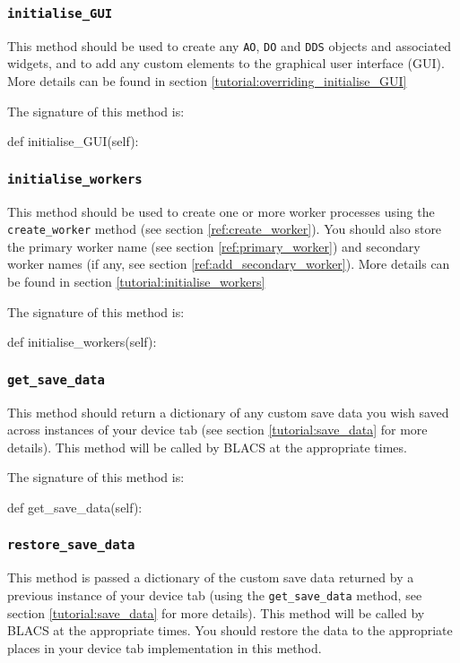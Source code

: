 \documentclass[12pt]{article}
\begin{document}
%
\subsubsection{\texttt{initialise\_GUI}}\label{ref:initialise_GUI}
This method should be used to create any \texttt{AO}, \texttt{DO} and \texttt{DDS} objects and associated widgets, and to add any custom elements to the graphical user interface (GUI).
More details can be found in section \ref{tutorial:overriding_initialise_GUI}

The signature of this method is:
\begin{python}
def initialise_GUI(self):
\end{python}

\subsubsection{\texttt{initialise\_workers}}\label{ref:initialise_workers}
This method should be used to create one or more worker processes using the \texttt{create\_worker} method (see section \ref{ref:create_worker}).
You should also store the primary worker name (see section \ref{ref:primary_worker}) and secondary worker names (if any, see section \ref{ref:add_secondary_worker}).
More details can be found in section \ref{tutorial:initialise_workers}

The signature of this method is:
\begin{python}
def initialise_workers(self):
\end{python}

\subsubsection{\texttt{get\_save\_data}}\label{ref:get_save_data}
This method should return a dictionary of any custom save data you wish saved across instances of your device tab (see section \ref{tutorial:save_data} for more details).
This method will be called by BLACS at the appropriate times.

The signature of this method is:
\begin{python}
def get_save_data(self):
\end{python}

\subsubsection{\texttt{restore\_save\_data}}\label{ref:restore_save_data}
This method is passed a dictionary of the custom save data returned by a previous instance of your device tab (using the \texttt{get\_save\_data} method, see section \ref{tutorial:save_data} for more details).
This method will be called by BLACS at the appropriate times.
You should restore the data to the appropriate places in your device tab implementation in this method.
\end{document}
